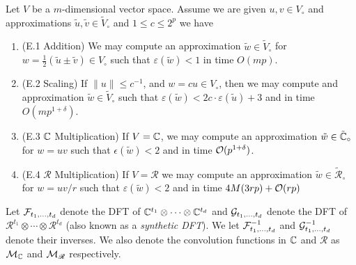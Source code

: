 \begin{proposition}
    Let $V$ be a $m$-dimensional vector space. Assume we are given $u, v \in V_\circ$ and approximations $\tilde{u}, \tilde{v} \in \tilde{V}_\circ$ and $1 \le c \le 2^p$ we have
    \begin{enumerate}
        \item (E.1 Addition) We may compute an approximation $\tilde{w} \in \tilde{V}_\circ$ for $w = \tfrac{1}{2}(\tilde{u} \pm \tilde{v}) \in V_\circ$ such that $\varepsilon(\tilde{w}) < 1$ in time $O(mp)$.
        \item (E.2 Scaling) If $\|u\| \le c^{-1}$, and $w = cu \in V_\circ$, then we may compute and approximation $\tilde{w} \in \tilde{V}_\circ$ such that $\varepsilon(\tilde{w}) < 2c \cdot \varepsilon(\tilde{u}) + 3$ and in time $O(mp^{1 + \delta})$.
        \item (E.3 ${\mathbb C}$ Multiplication) If $V = {\mathbb C}$, we may compute an approximation $\tilde{w} \in \tilde{{\mathbb C}}_\circ$ for $w = uv$ such that $\epsilon(\tilde{w}) < 2$ and in time $\mathcal O(p^{1 + \delta})$.
        \item (E.4 $\mathscr{R}$ Multiplication) If $V = \mathscr{R}$ we may compute an approximation $\tilde{w} \in \tilde{\mathscr{R}}_\circ$ for $w = uv/r$ such that $\varepsilon(\tilde{w}) < 2$ and in time $4M(3rp) + \mathcal O(rp)$
    \end{enumerate}
\end{proposition}

Let $\mathcal F_{t_1, \ldots, t_d}$ denote the DFT of ${\mathbb C}^{t_1} \otimes \cdots \otimes {\mathbb C}^{t_d}$ and $\mathcal G_{t_1, \ldots, t_d}$ denote the DFT of $\mathscr{R}^{t_1} \otimes \cdots \otimes \mathscr{R}^{t_d}$ (also known as a \emph{synthetic DFT}).
We let $\mathcal F^{-1}_{t_1, \ldots, t_d}$ and $\mathcal G_{t_1, \ldots, t_d}^{-1}$ denote their inverses.
We also denote the convolution functions in ${\mathbb C}$ and $\mathscr{R}$ as $\mathcal M_{\mathbb C}$ and $\mathcal M_\mathscr{R}$ respectively.

